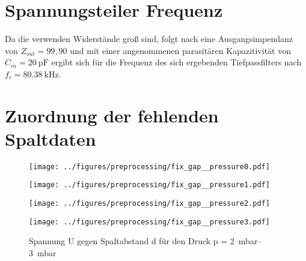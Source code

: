 \section{Spannungsteiler Frequenz}
Da die verwenden Widerstände groß sind, folgt nach  eine Ausgangsimpendanz von \(Z_{out} = 99,90\) und mit einer angenommenen parasitären Kapazitivität von \(C_{in} = \SI{20}{\pico\farad}\) ergibt sich für die Frequenz des sich ergebenden Tiefpassfilters nach  \(f_c = \SI{80,38}{\kilo\hertz}\).

\section{Zuordnung der fehlenden Spaltdaten}
  \begin{figure}[htbp]
    \centering
    \begin{minipage}[t]{0.3\textwidth}
        \centering
        \texttt{[image: ../figures/preprocessing/fix\_gap\_\_pressure0.pdf]}
        \caption{Spannung U gegen Spaltabstand d für den Druck p = \SI{0}{\milli\bar}}
        \label{fig:fix_gap_p00}
    \end{minipage}\hfill

    \begin{minipage}[t]{0.3\textwidth}
        \centering
        \texttt{[image: ../figures/preprocessing/fix\_gap\_\_pressure1.pdf]}
        \caption{Spannung U gegen Spaltabstand d für den Druck p = \SIrange{0}{1}{\milli\bar}}
        \label{fig:fix_gap_p0}
    \end{minipage}\hfill
    \begin{minipage}[t]{0.3\textwidth}
        \centering
        \texttt{[image: ../figures/preprocessing/fix\_gap\_\_pressure2.pdf]}
        \caption{Spannung U gegen Spaltabstand d für den Druck p = \SIrange{1}{2}{\milli\bar}}
        \label{fig:fix_gap_p1}
    \end{minipage}\hfill
    \begin{minipage}[t]{0.3\textwidth}
        \centering
        \texttt{[image: ../figures/preprocessing/fix\_gap\_\_pressure3.pdf]}
        \caption{Spannung U gegen Spaltabstand d für den Druck p = \SIrange{2}{3}{\milli\bar}}
        \label{fig:fix_gap_p2}
    \end{minipage}


\end{figure}
